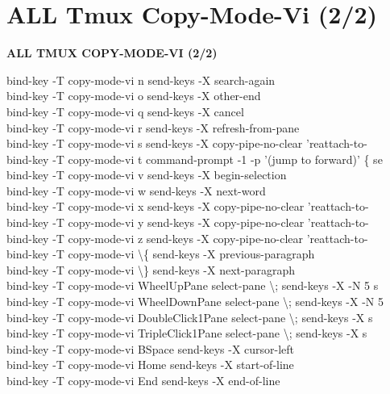 \documentclass[11pt,a4paper,twoside]{book}
\begin{document}
\section{ALL Tmux Copy-Mode-Vi (2/2)}


\vspace{10pt}
{\large\bfseries\color{neoncyan} ALL TMUX COPY-MODE-VI (2/2)}\vspace{6pt}

bind-key  -T copy-mode-vi n  send-keys -X search-again\\
bind-key  -T copy-mode-vi o  send-keys -X other-end\\
bind-key  -T copy-mode-vi q  send-keys -X cancel\\
bind-key  -T copy-mode-vi r  send-keys -X refresh-from-pane\\
bind-key  -T copy-mode-vi s  send-keys -X copy-pipe-no-clear 'reattach-to-\\
bind-key  -T copy-mode-vi t  command-prompt -1 -p '(jump to forward)' \{ se\\
bind-key  -T copy-mode-vi v  send-keys -X begin-selection\\
bind-key  -T copy-mode-vi w  send-keys -X next-word\\
bind-key  -T copy-mode-vi x  send-keys -X copy-pipe-no-clear 'reattach-to-\\
bind-key  -T copy-mode-vi y  send-keys -X copy-pipe-no-clear 'reattach-to-\\
bind-key  -T copy-mode-vi z  send-keys -X copy-pipe-no-clear 'reattach-to-\\
bind-key  -T copy-mode-vi \textbackslash{}\{  send-keys -X previous-paragraph\\
bind-key  -T copy-mode-vi \textbackslash{}\}  send-keys -X next-paragraph\\
bind-key  -T copy-mode-vi WheelUpPane  select-pane \textbackslash{}; send-keys -X -N 5 s\\
bind-key  -T copy-mode-vi WheelDownPane  select-pane \textbackslash{}; send-keys -X -N 5\\
bind-key  -T copy-mode-vi DoubleClick1Pane  select-pane \textbackslash{}; send-keys -X s\\
bind-key  -T copy-mode-vi TripleClick1Pane  select-pane \textbackslash{}; send-keys -X s\\
bind-key  -T copy-mode-vi BSpace  send-keys -X cursor-left\\
bind-key  -T copy-mode-vi Home  send-keys -X start-of-line\\
bind-key  -T copy-mode-vi End  send-keys -X end-of-line\\
\end{document}
